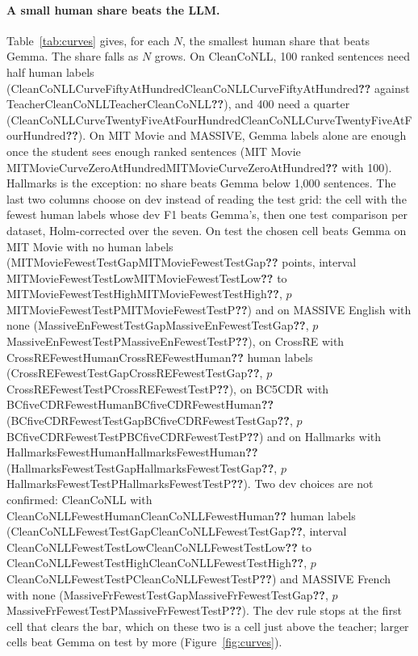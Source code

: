 \documentclass[11pt]{article}
\newcommand{\res}[1]{\ifcsname #1\endcsname\csname #1\endcsname\else\textbf{??}\fi}
\begin{document}
\paragraph{A small human share beats the LLM.} Table~\ref{tab:curves} gives, for each $N$, the smallest human share that beats Gemma. The share falls as $N$ grows. On CleanCoNLL, 100 ranked sentences need half human labels (\res{CleanCoNLLCurveFiftyAtHundred} against \res{TeacherCleanCoNLL}), and 400 need a quarter (\res{CleanCoNLLCurveTwentyFiveAtFourHundred}). On MIT Movie and MASSIVE, Gemma labels alone are enough once the student sees enough ranked sentences (MIT Movie \res{MITMovieCurveZeroAtHundred} with 100). Hallmarks is the exception: no share beats Gemma below 1{,}000 sentences. The last two columns choose on dev instead of reading the test grid: the cell with the fewest human labels whose dev F1 beats Gemma's, then one test comparison per dataset, Holm-corrected over the seven. On test the chosen cell beats Gemma on MIT Movie with no human labels (\res{MITMovieFewestTestGap} points, interval \res{MITMovieFewestTestLow} to \res{MITMovieFewestTestHigh}, $p$\,\res{MITMovieFewestTestP}) and on MASSIVE English with none (\res{MassiveEnFewestTestGap}, $p$\,\res{MassiveEnFewestTestP}), on CrossRE with \res{CrossREFewestHuman} human labels (\res{CrossREFewestTestGap}, $p$\,\res{CrossREFewestTestP}), on BC5CDR with \res{BCfiveCDRFewestHuman} (\res{BCfiveCDRFewestTestGap}, $p$\,\res{BCfiveCDRFewestTestP}) and on Hallmarks with \res{HallmarksFewestHuman} (\res{HallmarksFewestTestGap}, $p$\,\res{HallmarksFewestTestP}). Two dev choices are not confirmed: CleanCoNLL with \res{CleanCoNLLFewestHuman} human labels (\res{CleanCoNLLFewestTestGap}, interval \res{CleanCoNLLFewestTestLow} to \res{CleanCoNLLFewestTestHigh}, $p$\,\res{CleanCoNLLFewestTestP}) and MASSIVE French with none (\res{MassiveFrFewestTestGap}, $p$\,\res{MassiveFrFewestTestP}). The dev rule stops at the first cell that clears the bar, which on these two is a cell just above the teacher; larger cells beat Gemma on test by more (Figure~\ref{fig:curves}).

\begin{table}[t]
\centering
\small
{}
\caption{The same as Table~\ref{tab:curves}, with GPT-6 Luna as the teacher: LLM is Luna's test F1, the mixed cells have Luna labels for the non-human share, and Fewest (dev) beats Luna's dev F1. The human-only cells are shared with Table~\ref{tab:curves}.}
\label{tab:curvesluna}
\end{table}
\end{document}
